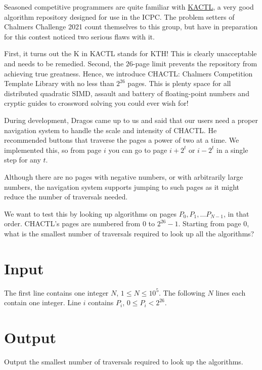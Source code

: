 Seasoned competitive programmers are quite familiar with \href{https://github.com/kth-competitive-programming/kactl}{\textsc{KACTL}}, a very good algorithm repository designed for use in the ICPC.
The problem setters of Chalmers Challenge 2021 count themselves to
this group, but have in preparation for this contest noticed two serious flaws with it.

First, it turns out the \textsc{K} in \textsc{KACTL} stands for \textsc{KTH}! This is clearly
unacceptable and needs to be remedied. Second, the $26$-page limit prevents the repository from
achieving true greatness. Hence, we introduce \textsc{CHACTL}: Chalmers Competition Template Library
with no less than $2^{26}$ pages. This is plenty space for all distributed quadratic SIMD, assault and
battery of floating-point numbers and cryptic guides to crossword solving you could ever wish for!

During development, Dragos came up to us and said that our users need a proper navigation system to
handle the scale and intensity of \textsc{CHACTL}. He recommended buttons that traverse the pages a
power of two at a time. We implemented this, so from page $i$ you can go to page $i + 2^t$ or $i -
2^t$ in a single step for any $t$.

Although there are no pages with negative numbers, or with arbitrarily large numbers, the navigation
system supports jumping to such pages as it might reduce the number of traversals needed.

We want to test this by looking up algorithms on pages $P_0, P_1, \ldots P_{N-1}$, in that order.
\textsc{CHACTL}'s pages are numbered from $0$ to $2^{26} - 1$. Starting from page $0$, what is the
smallest number of traversals required to look up all the algorithms?

\section*{Input}
The first line contains one integer $N$, $1 \le N \le 10^5$. The following $N$ lines each contain
one integer. Line $i$ contains $P_i$, $0 \le P_i < 2^{26}$.

\section*{Output}
Output the smallest number of traversals required to look up the algorithms.
